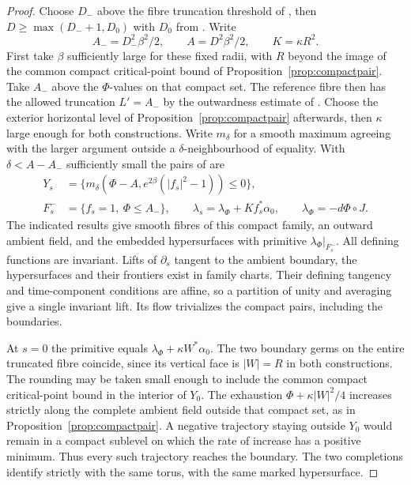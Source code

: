 \begin{proof}
Choose $D_-$ above the fibre truncation threshold of \cite[Q.2]{FHSZ}, then $D\ge\max(D_-+1,D_0)$ with $D_0$ from \cite[U.31]{FHSZ}. Write
\[
        A_-=D_-^2\beta^2/2,\qquad A=D^2\beta^2/2,\qquad K=\kappa R^2.
\]
First take $\beta$ sufficiently large for these fixed radii, with $R$ beyond the image of the common compact critical-point bound of Proposition~\ref{prop:compactpair}. Take $A_-$ above the $\Phi$-values on that compact set. The reference fibre then has the allowed truncation $L'=A_-$ by the outwardness estimate of \cite[Q.2]{FHSZ}. Choose the exterior horizontal level of Proposition~\ref{prop:compactpair} afterwards, then $\kappa$ large enough for both constructions. Write $m_\delta$ for a smooth maximum agreeing with the larger argument outside a $\delta$-neighbourhood of equality. With $\delta<A-A_-$ sufficiently small the pairs of \cite[Q.15--Q.16, Q.21, Q.23--Q.27 and Q.35]{FHSZ} are
\begin{align*}
 Y_s&=\{m_\delta(\Phi-A,e^{2\beta}(|f_s|^2-1))\le0\},\\
 F_s^-&=\{f_s=1,\ \Phi\le A_-\},\qquad
 \lambda_s=\lambda_\Phi+K f_s^*\alpha_0,\qquad
 \lambda_\Phi=-d\Phi\circ J .
\end{align*}
The indicated results give smooth fibres of this compact family, an outward ambient field, and the embedded hypersurfaces with primitive $\lambda_\Phi|_{F_s^-}$. All defining functions are invariant. Lifts of $\partial_s$ tangent to the ambient boundary, the hypersurfaces and their frontiers exist in family charts. Their defining tangency and time-component conditions are affine, so a partition of unity and averaging give a single invariant lift. Its flow trivializes the compact pairs, including the boundaries.

At $s=0$ the primitive equals $\lambda_\Phi+\kappa W^*\alpha_0$. The two boundary germs on the entire truncated fibre coincide, since its vertical face is $|W|=R$ in both constructions. The rounding may be taken small enough to include the common compact critical-point bound in the interior of $Y_0$. The exhaustion $\Phi+\kappa |W|^2/4$ increases strictly along the complete ambient field outside that compact set, as in Proposition~\ref{prop:compactpair}. A negative trajectory staying outside $Y_0$ would remain in a compact sublevel on which the rate of increase has a positive minimum. Thus every such trajectory reaches the boundary. The two completions identify strictly with the same torus, with the same marked hypersurface.


\end{proof}
